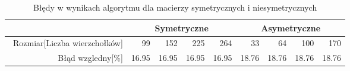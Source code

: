 \begin{table}
\begin{tabular}{|r|r|r|r|r|r|r|r|r|}
\hline
 & \multicolumn{4}{|c|}{Symetryczne} & \multicolumn{4}{|c|}{Asymetryczne} \\ \hline\
Rozmiar[Liczba wierzchołków] & 99 & 152 & 225 & 264 & 33 & 64 & 100 & 170 \\ \hline
Błąd wzgledny[\%] & 16.95 & 16.95 & 16.95 & 16.95 & 18.76 & 18.76 & 18.76 & 18.76 \\ \hline
\end{tabular}
\caption{Błędy w wynikach algorytmu dla macierzy symetrycznych i niesymetrycznych}
\label{tab:error_TsNN}
\end{table}
